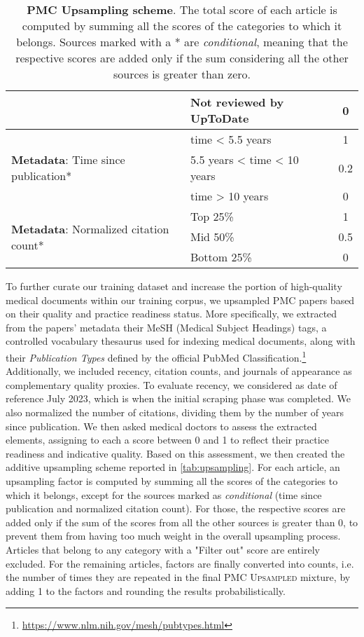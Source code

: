 \documentclass{article}
\begin{document}
\begin{table}[t]
{\begin{tabular}{llc}
    & Not reviewed by UpToDate & 0 \\
    \midrule
    \multirow{3}[1]{*}{\textbf{Metadata}: Time since publication*} & time < 5.5 years & 1 \\
          & 5.5 years < time < 10 years & 0.2 \\
          & time > 10 years & 0 \\
    \midrule
    \multirow{3}[1]{*}{\textbf{Metadata}: Normalized citation count*} & Top 25\% & 1 \\
          & Mid 50\% & 0.5 \\
          & Bottom 25\% & 0 \\
    \bottomrule
    \end{tabular}
    }
  \caption{\textbf{PMC Upsampling scheme}. The total score of each article is computed by summing all the scores of the categories to which it belongs. Sources marked with a * are \textit{conditional}, meaning that the respective scores are added only if the sum considering all the other sources is greater than zero. }
  \label{tab:upsampling}
\end{table}

To further curate our training dataset and increase the portion of high-quality medical documents within our training corpus, we upsampled PMC papers based on their quality and practice readiness status. 
More specifically, we extracted from the papers' metadata their MeSH (Medical Subject Headings) tags, a controlled vocabulary thesaurus used for indexing medical documents, along with their \textit{Publication Types} defined by the official PubMed Classification.\footnote{\url{https://www.nlm.nih.gov/mesh/pubtypes.html}} Additionally, we included recency, citation counts, and journals of appearance as complementary quality proxies. To evaluate recency, we considered as date of reference July 2023, which is when the initial scraping phase was completed. We also normalized the number of citations, dividing them by the number of years since publication. We then asked medical doctors to assess the extracted elements, assigning to each a score between 0 and 1 to reflect their practice readiness and indicative quality. Based on this assessment, we then created the additive upsampling scheme reported in \autoref{tab:upsampling}. For each article, an upsampling factor is computed by summing all the scores of the categories to which it belongs, except for the sources marked as \textit{conditional} (time since publication and normalized citation count). For those, the respective scores are added only if the sum of the scores from all the other sources is greater than 0, to prevent them from having too much weight in the overall upsampling process. Articles that belong to any category with a "Filter out" score are entirely excluded. For the remaining articles, factors are finally converted into counts, i.e. the number of times they are repeated in the final \textsc{PMC Upsampled} mixture, by adding 1 to the factors and rounding the results probabilistically. 
\end{document}

